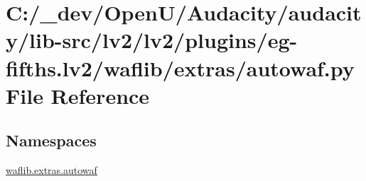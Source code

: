 \hypertarget{lv2_2plugins_2eg-fifths_8lv2_2waflib_2extras_2autowaf_8py}{}\section{C\+:/\+\_\+dev/\+Open\+U/\+Audacity/audacity/lib-\/src/lv2/lv2/plugins/eg-\/fifths.lv2/waflib/extras/autowaf.py File Reference}
\label{lv2_2plugins_2eg-fifths_8lv2_2waflib_2extras_2autowaf_8py}
\subsection*{Namespaces}
\begin{DoxyCompactItemize}
\item 
 \hyperlink{namespacewaflib_1_1extras_1_1autowaf}{waflib.\+extras.\+autowaf}
\end{DoxyCompactItemize}
